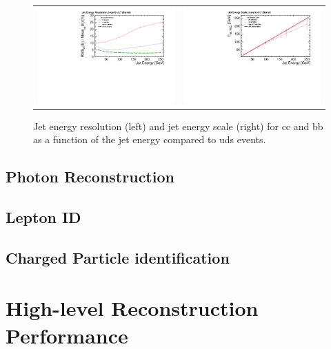 %
% 
\begin{figure}[b!]
\begin{tabular}{cc}
\includegraphics[width=0.5\hsize]{Performance/fig/Jet_Energy_Resolution_Barrel_new_cc_bb.pdf} &
\includegraphics[width=0.5\hsize]{Performance/fig/Jet_Energy_Scale_Barrel_new_cc_bb.pdf}
\end{tabular}
\caption{\label{ild:fig:intro:tracking} Jet energy resolution (left) and jet energy scale (right) for cc and bb  as a function of the jet
  energy compared to uds events.}
 \end{figure}


\subsection{Photon Reconstruction}

\subsection{Lepton ID}

\subsection{Charged Particle identification}



\section{High-level Reconstruction Performance}

